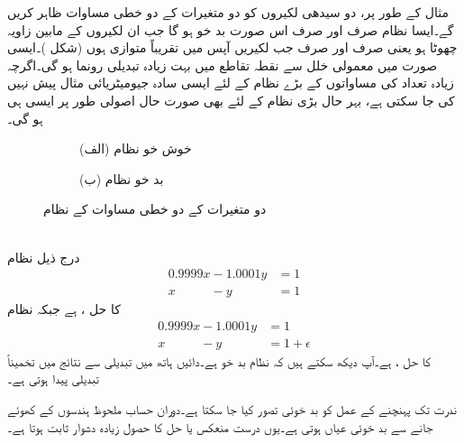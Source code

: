 مثال کے طور پر، دو سیدھی لکیروں کو دو متغیرات کے دو خطی مساوات ظاہر کریں گے۔ایسا نظام صرف اور صرف اس صورت بد خو ہو گا جب ان لکیروں کے مابین زاویہ  چھوٹا ہو یعنی صرف اور صرف جب لکیریں آپس میں تقریباً متوازی ہوں (شکل )۔ایسی صورت میں معمولی خلل سے نقطہ تقاطع میں بہت زیادہ تبدیلی رونما ہو گی۔اگرچہ زیادہ تعداد کی مساواتوں کے بڑے نظام کے لئے ایسی سادہ جیومیٹریائی مثال پیش نہیں کی جا سکتی ہے، بہر حال بڑی نظام کے لئے بھی  صورت حال اصولی طور پر ایسی ہی ہو گی۔ 
\begin{figure}
\centering
\begin{subfigure}{0.5\textwidth}
\centering
{}
\caption*{(الف) خوش خو نظام}
\end{subfigure}%
\begin{subfigure}{0.5\textwidth}
\centering
{}
\caption*{(ب) بد خو نظام}
\end{subfigure}%
\caption{دو متغیرات کے دو خطی مساوات کے نظام}
\label{شکل_خطی_اعدادی_بد_خو_خوش_خو}
\end{figure}

\quad {}\\
درج ذیل نظام
\begin{align*}
0.9999x-1.0001y&=1\\
x\phantom{1.0000}-y&=1
\end{align*}
کا حل ،  ہے جبکہ نظام
\begin{align*}
0.9999x-1.0001y&=1\\
x\phantom{1.0000}-y&=1+\epsilon
\end{align*}
کا حل ،  ہے۔آپ دیکھ سکتے ہیں کہ نظام بد خو ہے۔دائیں ہاتھ میں  تبدیلی سے نتائج میں تخمیناً   تبدیلی پیدا ہوتی ہے۔

ندرت تک پہنچنے کے عمل کو بد خوئی تصور کیا جا سکتا ہے۔دوران حساب ملحوظ ہندسوں کے کھوئے جانے سے بد خوئی عیاں ہوتی ہے۔یوں درست منعکس یا حل کا حصول زیادہ دشوار ثابت ہوتا ہے۔

